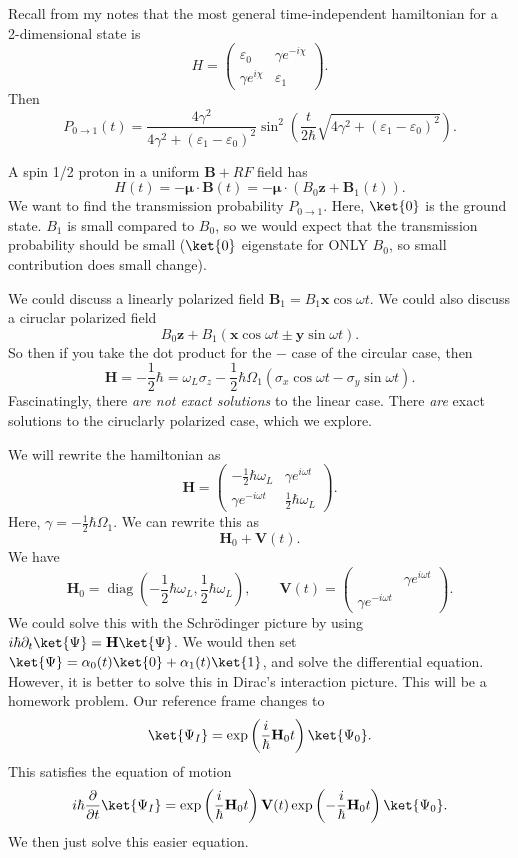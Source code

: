 
Recall from my notes that the most general time-independent hamiltonian for a 2-dimensional state is
\[
	H=\begin{pmatrix}
	\varepsilon _0 & \gamma e^{-i\chi }  \\
	\gamma e^{i\chi }  & \varepsilon _1
	\end{pmatrix}
.\]
Then
\[
	P_{0\to 1} (t)=\frac{4\gamma ^2}{4\gamma ^2+(\varepsilon _1-\varepsilon _0)^2} \sin ^2\left( \frac{t}{2\hbar} \sqrt{4\gamma ^2+(\varepsilon _1-\varepsilon _0)^2}  \right) 
.\]

A spin 1/2 proton in a uniform $\mathbf{B} +RF$ field has
\[
	H(t)=-\boldsymbol{\mu} \cdot \mathbf{B} (t)= -\boldsymbol{\mu} \cdot \left( B_0\mathbf{z} +\mathbf{B} _1(t) \right) 
.\]
We want to find the transmission probability $P_{0\to 1} $. Here, $\ket{0}$ is the ground state. $B_1$ is small compared to $B_0$, so we would expect that the transmission probability should be small ($\ket{0}$ eigenstate for ONLY $B_0$, so small contribution does small change).

We could discuss a linearly polarized field $\mathbf{B} _1=B_1 \mathbf{x} \cos \omega t$. We could also discuss a ciruclar polarized field
\[
	B_0 \mathbf{z} +B_1\left( \mathbf{x} \cos \omega t \pm \mathbf{y} \sin \omega t \right) 
.\]
So then if you take the dot product for the $-$ case of the circular case, then
\[
	\mathbf{H} =-\frac{1}{2}  \hbar=\omega _L \sigma _z-\frac{1}{2} \hbar\Omega _1\left( \sigma _x \cos \omega t-\sigma _y \sin \omega t \right) 
.\]
Fascinatingly, there \emph{are not exact solutions} to the linear case. There \emph{are} exact solutions to the ciruclarly polarized case, which we explore.

We will rewrite the hamiltonian as
\[
	\mathbf{H} =\begin{pmatrix}
	-\frac{1}{2} \hbar\omega _L & \gamma e^{i\omega t}  \\
	\gamma e^{-i\omega t}  & \frac{1}{2} \hbar\omega _L
	\end{pmatrix}
.\]
Here, $\gamma =-\frac{1}{2} \hbar \Omega _1$. We can rewrite this as
\[
	\mathbf{H} _0+\mathbf{V} (t)
.\]
We have
\[
	\mathbf{H} _0=\operatorname{diag} \left( -\frac{1}{2} \hbar \omega _L,\frac{1}{2} \hbar\omega _L \right) ,\qquad \mathbf{V} (t)=\begin{pmatrix}
	 & \gamma e^{i\omega t}  \\
	\gamma e^{-i\omega t}  & 
	\end{pmatrix}
.\]
We could solve this with the Schr\"odinger picture by using $i\hbar \partial_t \ket{\Psi }=\mathbf{H} \ket{\Psi }$. We would then set $\ket{\Psi }=\alpha _0(t)\ket{0}+\alpha _1(t)\ket{1}$, and solve the differential equation. However, it is better to solve this in Dirac's interaction picture. This will be a homework problem. Our reference frame changes to
\[
	\ket{\Psi _I}=\exp \left( \frac{i}{\hbar} \mathbf{H} _0t \right) \ket{\Psi_0}
.\]
This satisfies the equation of motion
\[
	i\hbar \frac{\partial }{\partial t} \ket{\Psi _I}=\exp \left( \frac{i}{\hbar} \mathbf{H} _0t \right) \mathbf{V} (t)\exp \left( -\frac{i}{\hbar} \mathbf{H} _0t \right) \ket{\Psi _0}
.\]
We then just solve this easier equation.

